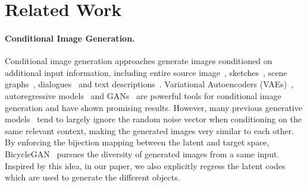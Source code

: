 \documentclass[10pt,twocolumn,letterpaper]{article}
\begin{document}
\section{Related Work}
\label{sec:related_work}
\paragraph{Conditional Image Generation.} Conditional image generation approaches generate images conditioned on additional input information, including entire source image~\cite{isola2017image,liu2017unsupervised, Pathak2016, Yang2017, Zhao2018, zhu2017unpaired, zhu2017toward}, sketches~\cite{isola2017image, Sangkloy2017, wang2017high, Xian2018,zhu2017toward}, scene graphs~\cite{Johnson2018}, dialogues~\cite{kim2017codraw, sharma2018chatpainter} and text descriptions~\cite{mansimov2015generating, reed2017parallel,  tan2018text2scene, zhang2017stackgan}. Variational Autoencoders (VAEs)~\cite{kingma2013auto, mansimov2015generating, sohn2015learning}, autoregressive models~\cite{oord2016pixel, van2016conditional} and GANs~\cite{isola2017image, mirza2014conditional, wang2017high, zhu2017unpaired} are powerful tools for conditional image generation and have shown promising results.  
However, many previous generative models~\cite{isola2017image,Pathak2016,Sangkloy2017,Xian2018,Yang2017,zhu2017unpaired} tend to largely ignore the random noise vector when conditioning on the same relevant context, making the generated images very similar to each other. 
By enforcing the bijection mapping between the latent and target space, BicycleGAN~\cite{zhu2017toward} pursues the diversity of generated images from a same input. Inspired by this idea, in our paper, we also explicitly regress the latent codes which are used to generate the different objects.



\vspace{-0.15in}
\end{document}
